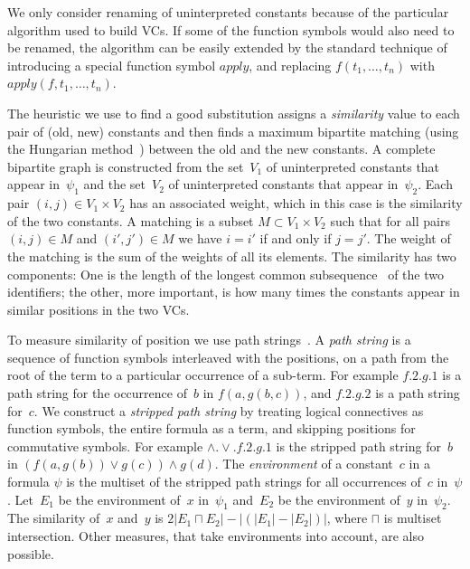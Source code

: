 \documentclass{llncs}
\begin{document}
We only consider renaming of uninterpreted constants because 
of the particular algorithm used to build VCs. If some of the 
function symbols would also need to be renamed, the algorithm 
can be easily extended by the standard technique of introducing 
a special function symbol $apply$, and replacing 
$f(t_1,\dots,t_n)$ with $apply(f,t_1,\dots,t_n)$.

The heuristic we use to find a good substitution assigns 
a \emph{similarity} value to each pair of (old, new) constants 
and then finds a maximum bipartite matching (using the Hungarian
method~\cite{hungarian_alg}) between the old and
the new constants. A complete bipartite graph is 
constructed from the set~$V_1$ of uninterpreted constants that appear
in~$\psi_1$ and the set~$V_2$ of uninterpreted constants that appear
in~$\psi_2$. Each pair $(i, j)\in V_1\times V_2$ 
has an associated weight, which in this case is
the similarity of the two constants. A matching
is a subset $M\subset V_1\times V_2$ such that
for all pairs $(i, j)\in M$ and $(i', j')\in M$
we have $ i = i'$ if and only if $ j = j' $.
The weight of the matching is the sum of the weights of all its elements.
The similarity has two components: One is the length of the longest
common subsequence~\cite{lcs} of the two identifiers; the other, more
important, is how many times the constants appear in similar positions
in the two VCs.  

To measure similarity of position we use path
strings~\cite{termIndexing}.  A \emph{path string} is a sequence of
function symbols interleaved with the positions, on a path from the
root of the term to a particular occurrence of a sub-term.  For example
$f.2.g.1$ is a path string for the occurrence of~$b$ in $f(a,g(b,c))$, and
$f.2.g.2$ is a path string for~$c$.  We construct a \emph{stripped path string}
by treating logical connectives as function symbols, the entire formula as
a term, and skipping positions for commutative symbols.
For example $\wedge . \!\!\vee\!\! . f.2.g.1$ is the stripped path string 
for~$b$ in $(f(a,g(b)) \vee g(c)) \wedge g(d)$.
The \emph{environment} of a constant~$c$ in a formula $\psi$
is the multiset of the stripped path strings for all occurrences 
of~$c$ in~$\psi$.  Let~$E_1$ be the environment of~$x$ in~$\psi_1$ 
and~$E_2$ be the environment of~$y$ in~$\psi_2$. The similarity
of~$x$ and~$y$ is $2 |E_1 \sqcap E_2| - | (|E_1| - |E_2|) |$,
where $\sqcap$ is multiset intersection.
Other measures, that take environments into account, are also possible.
\end{document}

